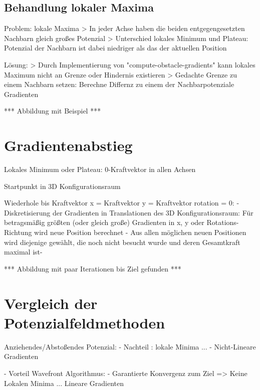 \subsection{Behandlung lokaler Maxima}

Problem: lokale Maxima
> In jeder Achse haben die beiden entgegengesetzten Nachbarn gleich großes Potenzial
> Unterschied lokales Minimum und Plateau: Potenzial der Nachbarn ist dabei niedriger als das der aktuellen Position

Lösung:
> Durch Implementierung von "compute-obstacle-gradients" kann lokales Maximum nicht an Grenze oder Hindernis existieren
> Gedachte Grenze zu einem Nachbarn setzen: Berechne Differnz zu einem der Nachbarpotenziale Gradienten

*** Abbildung mit Beispiel ***

\section{Gradientenabstieg}

Lokales Minimum oder Plateau: 0-Kraftvektor in allen Achsen

Startpunkt in 3D Konfigurationsraum

Wiederhole bis Kraftvektor x = Kraftvektor y = Kraftvektor rotation = 0:
	- Diskretisierung der Gradienten in Translationen des 3D Konfigurationsraum: Für betragsmäßig größten (oder gleich große) Gradienten in x, y oder Rotations-Richtung wird neue Position berechnet
	- Aus allen möglichen neuen Positionen wird diejenige gewählt, die noch nicht besucht wurde und deren Gesamtkraft maximal ist-

*** Abbildung mit paar Iterationen bis Ziel gefunden ***


\section{Vergleich der Potenzialfeldmethoden}

Anziehendes/Abstoßendes Potenzial:
	- Nachteil : lokale Minima
	...
	- Nicht-Lineare Gradienten


- Vorteil Wavefront Algorithmus: 
	- Garantierte Konvergenz zum Ziel => Keine Lokalen Minima
	...
	Lineare Gradienten